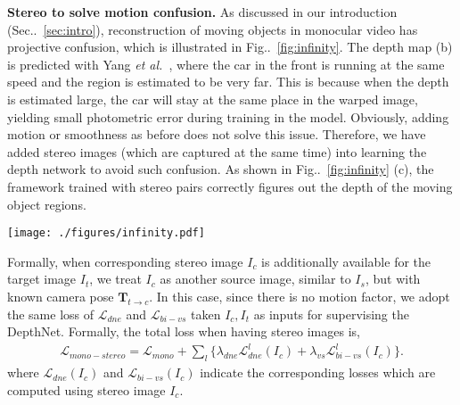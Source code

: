 \documentclass[runningheads]{llncs}
\makeatletter
\newcommand{\figref}[1]{Fig\onedot~\ref{#1}}
\newcommand{\secref}[1]{Sec\onedot~\ref{#1}}
\newcommand{\ve}[1]{{\mathbf #1}} \newcommand{\hua}[1]{{\mathcal #1}}
\newcommand{\scr}[1]{{\mathcal #1}}
\DeclareRobustCommand\onedot{\futurelet\@let@token\@onedot}
\def\onedot{\ifx\@let@token.\else.\null\fi\xspace}
\def\etal{\emph{et al.}}
\makeatother
\begin{document}
\noindent\textbf{Stereo to solve motion confusion.}
As discussed in our introduction (\secref{sec:intro}), reconstruction of moving objects in monocular video has projective confusion, which is illustrated in \figref{fig:infinity}. The depth map (b) is predicted with Yang \etal~\cite{yang2018cvpr}, where the car in the front is running at the same speed and the region is estimated to be very far. This is because when the depth is estimated large, the car will stay at the same place in the warped image, yielding small photometric error during training in the model. Obviously, adding motion or smoothness as before does not solve this issue. Therefore, we have added stereo images (which are captured at the same time) into learning the depth network to avoid such confusion. As shown in \figref{fig:infinity} (c), the framework trained with stereo pairs correctly figures out the depth of the moving object regions. 

\begin{figure*}
\vspace{-0.5\baselineskip}
\centering
\texttt{[image: ./figures/infinity.pdf]}
\caption{Moving object in the scene (a) causes large depth value confusion for framework trained with monocular videos, as shown in (b). This issue can be resolved by incorporating stereo training samples into the framework (c). }
\label{fig:infinity}
\vspace{-0.5\baselineskip}
\end{figure*}

Formally, when corresponding stereo image $I_{c}$ is additionally available for the target image $I_{t}$, we treat $I_{c}$ as another source image, similar to $I_{s}$, but with known camera pose $\ve{T}_{t\rightarrow c}$. In this case, since there is no motion factor, we adopt the same loss of $\hua{L}_{dne}$ and $\hua{L}_{bi-vs}$ taken $I_{c}, I_{t}$ as inputs for supervising the DepthNet. Formally, the total loss when having stereo images is, 
\begin{align}
\scr{L}_{mono-stereo}\! =\! \scr{L}_{mono} + \sum\nolimits_l\{\lambda_{dne}\scr{L}_{dne}^l(I_c) + \lambda_{vs}\scr{L}_{bi-vs}^l(I_c)\}.
\end{align}
where $\scr{L}_{dne}(I_c)$ and $\scr{L}_{bi-vs}(I_c)$ indicate the corresponding losses which are computed using stereo image $I_c$.
\end{document}
